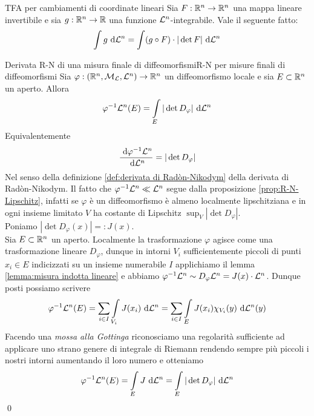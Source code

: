 \documentclass{article}
\begin{document}
\begin{theorem}{TFA per cambiamenti di coordinate lineari}{}
    Sia $F : \mathbb{R}^n \to \mathbb{R}^n$ una mappa lineare invertibile e sia $g: \mathbb{R}^n \to \mathbb{R}$ una funzione $\mathcal{L}^n$-integrabile. Vale il seguente fatto:
    \[\intop g \de \L^n = \intop (g \circ F) \cdot |\det F| \de \L^n \] 
\end{theorem}


\begin{theorem}{Derivata R-N di una misura finale di diffeomorfismi}{R-N per misure finali di diffeomorfismi}
    Sia $\varphi : (\mathbb{R}^n, \mathcal{M}_{\mathcal{L}}, \mathcal{L}^n) \to \mathbb{R}^n$ un diffeomorfismo locale e sia $E \subset \mathbb{R}^n$ un aperto. Allora 
    \[\varphi^{-1}\L^n(E) = \intop_E|\det D_\varphi|\de \L^n\]
    Equivalentemente
    \[\frac{\text{ d} \varphi^{-1} \mathcal{L}^n}{\text{ d} \mathcal{L}^n} = |\det D_\varphi|\]
    Nel senso della definizione \ref{def:derivata di Radòn-Nikodym} della derivata di Radòn-Nikodym.
    \proof
    Il fatto che $\varphi^{-1}\mathcal{L}^n \ll \mathcal{L}^n$ segue dalla proposizione \ref{prop:R-N-Lipschitz}, infatti se $\varphi$ è un diffeomorfismo è almeno localmente lipschitziana e in ogni insieme limitato $V$ ha costante di Lipschitz $\sup_V |\det D_\varphi|$.\\
    Poniamo $|\det D_\varphi(x)| =: J(x)$.\\
    Sia $E\subset \mathbb{R}^n$ un aperto. Localmente la trasformazione $\varphi$ agisce come una trasformazione lineare $D_\varphi$, dunque in intorni $V_i$ sufficientemente piccoli di punti $x_i\in E$ indicizzati su un insieme numerabile $I$ applichiamo il lemma \ref{lemma:misura indotta lineare} e abbiamo $\varphi^{-1} \mathcal{L}^n \sim D_\varphi \mathcal{L}^n = J(x)\cdot \mathcal{L}^n$. Dunque posti possiamo scrivere
    \[\varphi^{-1}\L^n(E) = \sum_{i \in I} \intop_{V_i} J(x_i)\de \L^n = \sum_{i \in I} \intop_E J(x_i) \chi_{V_i}(y)\de \L^n(y)\]
    Facendo una \textit{mossa alla Gottinga} riconosciamo una regolarità sufficiente ad applicare uno strano genere di integrale di Riemann rendendo sempre più piccoli i nostri intorni aumentando il loro numero e otteniamo
    \[\varphi^{-1}\L^n(E) = \intop_E J \de \L^n = \intop_E |\det D_\varphi|\de \L^n\]
    \qed 
\end{theorem}
\end{document}
